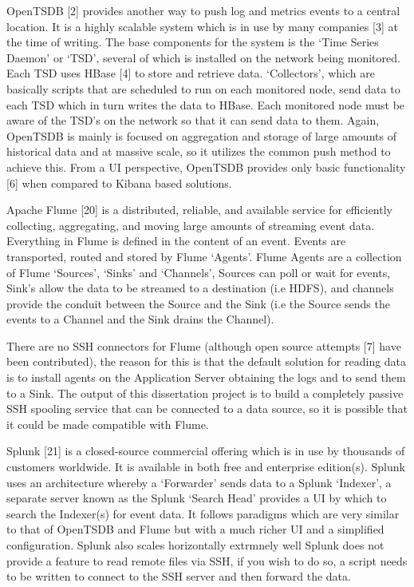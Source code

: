 \documentclass{llncs}
\begin{document}
OpenTSDB [2] provides another way to push log and metrics events to a central location. It is a highly scalable system which is in use by many companies [3] at the time of writing. The base components for the system is the ‘Time Series Daemon’ or ‘TSD’, several of which is installed on the network being monitored. Each TSD uses HBase [4] to store and retrieve data. ‘Collectors’, which are basically scripts that are scheduled to run on each monitored node, send data to each TSD which in turn writes the data to HBase. Each monitored node must be aware of the TSD’s on the network so that it can send data to them. Again, OpenTSDB is mainly is focused on aggregation and storage of large amounts of historical data and at massive scale, so it utilizes the common push method to achieve this. From a UI perspective, OpenTSDB provides only basic functionality [6] when compared to Kibana based solutions.

Apache Flume [20] is a distributed, reliable, and available service for efficiently collecting, aggregating, and moving large amounts of streaming event data. Everything in Flume is defined in the content of an event. Events are transported, routed and stored by Flume ‘Agents’. Flume Agents are a collection of Flume ‘Sources’, ‘Sinks’ and ‘Channels’, Sources can poll or wait for events, Sink’s allow the data to be streamed to a destination (i.e HDFS), and channels provide the conduit between the Source and the Sink (i.e the Source sends the events to a Channel and the Sink drains the Channel).

There are no SSH connectors for Flume (although open source attempts [7] have been contributed), the reason for this is that the default solution for reading data is to install agents on the Application Server obtaining the logs and to send them to a Sink. The output of this dissertation project is to build a completely passive SSH spooling service that can be connected to a data source, so it is possible that it could be made compatible with Flume.

Splunk [21] is a closed-source commercial offering which is in use by thousands of customers worldwide. It is available in both free and enterprise edition(s). Splunk uses an architecture whereby a ‘Forwarder’ sends data to a Splunk ‘Indexer’, a separate server known as the Splunk ‘Search Head’ provides a UI by which to search the Indexer(s) for event data. It follows paradigms which are very similar to that of OpenTSDB and Flume but with a much richer UI and a simplified configuration. Splunk also scales horizontally extrmnely well Splunk does not provide a feature to read remote files via SSH, if you wish to do so, a script needs to be written to connect to the SSH server and then forward the data.
\end{document}
